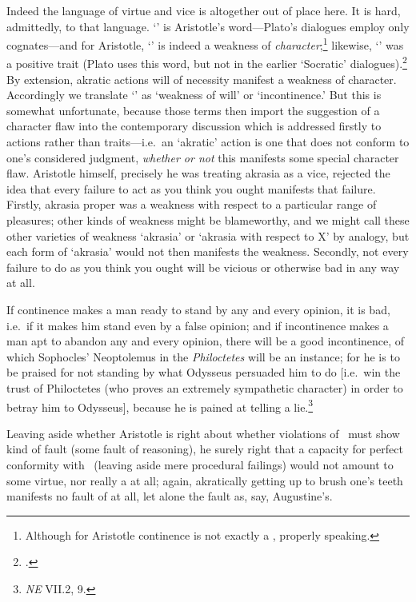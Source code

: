 \documentclass[11pt,letterpaper,oneside]{amsart}
\begin{document}
Indeed the language of virtue and vice is altogether out of place here. It is hard, admittedly, to  that language. `' is Aristotle's word---Plato's dialogues employ only cognates---and for Aristotle, `' is indeed a weakness of \emph{character};\footnote{Although for Aristotle continence is not exactly a , properly speaking.} likewise, `' was a positive trait (Plato uses this word, but not in the earlier `Socratic' dialogues).\footnote{\citet[p.\ 503 n.\ 15]{vlastos1983historical}.} By extension, akratic actions will of necessity manifest a weakness of character. Accordingly we translate `' as `weakness of will' or `incontinence.' But this is somewhat unfortunate, because those terms then import the suggestion of a character flaw into the contemporary discussion which is addressed firstly to actions rather than traits---i.e.\ an `akratic' action is one that does not conform to one's considered judgment, \emph{whether or not} this manifests some special character flaw. Aristotle himself, precisely  he was treating akrasia as a vice, rejected the idea that every failure to act as you think you ought manifests that failure. Firstly, akrasia proper was a weakness with respect to a particular range of pleasures; other kinds of weakness might be blameworthy, and we might call these other varieties of weakness `akrasia' or `akrasia with respect to X' by analogy, but each form of `akrasia' would not then manifests the  weakness. Secondly, not every failure to do as you think you ought will be vicious or otherwise bad in any way at all.\begin{squote}If continence makes a man ready to stand by any and every opinion, it is bad, i.e.\ if it makes him stand even by a false opinion; and if incontinence makes a man apt to abandon any and every opinion, there will be a good incontinence, of which Sophocles' Neoptolemus in the \emph{Philoctetes} will be an instance; for he is to be praised for not standing by what Odysseus persuaded him to do [i.e.\ win the trust of Philoctetes (who proves an extremely sympathetic character) in order to betray him to Odysseus], because he is pained at telling a lie.\footnote{\emph{NE} VII.2, 9.}\end{squote} Leaving aside whether Aristotle is right about whether violations of \enk\ must show  kind of fault (\ie some fault of reasoning), he surely  right that a capacity for perfect conformity with \enk\ (leaving aside mere procedural failings) would not amount to some  virtue, nor really a  at all; again, akratically getting up to brush one's teeth manifests no fault of  at all, let alone the  fault as, say, Augustine's.
\end{document}
